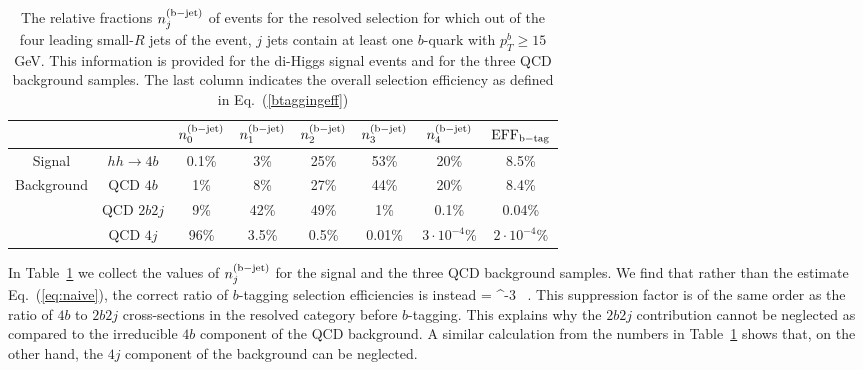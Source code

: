 \begin{table}[t]
  \centering
  \small
  \begin{tabular}{|c|c|c|c|c|c|c|c|}
    \hline
  \multicolumn{2}{|c|}{}   &  $n^{\rm (b-jet)}_0$  &  $n^{\rm (b-jet)}_1$  &  $n^{\rm (b-jet)}_2$  & $n^{\rm (b-jet)}_3$ &
    $n^{\rm (b-jet)}_4$ & ${\rm EFF}_{\rm b-tag}$ \\
    \hline
    \hline
    Signal  &  $hh\to 4b$  &   0.1\%    & 3\%     &  25\%     & 53\%     & 20\%      & 8.5\%  \\
    \hline
    \multirow{3}{*}{Background}  &  QCD $4b$  & 1\%      &  8\%    &   27\%   &  44\%     & 20\%       &  8.4\% \\
     &  QCD $2b2j$  &   9\%    & 42\%     &  49\%    & 1\%     &  0.1\%     & 0.04\%  \\
    &  QCD $4j$  &   96\%    &  3.5\%     & 0.5\%     &  0.01\%    & $3\cdot 10^{-4}$\%      &
    $2\cdot 10^{-4}$\%\\
    \hline
  \end{tabular}
  \caption{\small
    The relative fractions  $n^{\rm (b-jet)}_j$ of events for the resolved selection
    for which out of the four leading small-$R$ jets of the
    event, $j$ jets
    contain at least one $b$-quark with $p_T^b\ge 15$ GeV.
    This information is provided
    for the di-Higgs signal events and for the three QCD background samples.
    The last column indicates the overall 
    selection efficiency as defined in
    Eq.~(\ref{btaggingeff})
    \label{tab:btaggingcheck}
  }
  \end{table}

In Table~\ref{tab:btaggingcheck} we collect
the values of $n^{\rm (b-jet)}_j$ for the signal and the three QCD background samples.
%
We find that rather than the estimate Eq.~(\ref{eq:naive}),
the correct ratio of $b$-tagging selection efficiencies is instead
\be
{}=
   ^{-3} \, .
  \ee
  This suppression factor is of the same order as
  the ratio of $4b$ to $2b2j$ cross-sections
  in the resolved category before $b$-tagging.
    This explains why the $2b2j$ contribution cannot be neglected as compared
    to the irreducible $4b$ component of the QCD background.
    A similar calculation from the numbers in Table~\ref{tab:btaggingcheck}
    shows
    that, on the other hand, the $4j$ component of the background
    can be neglected.

    
